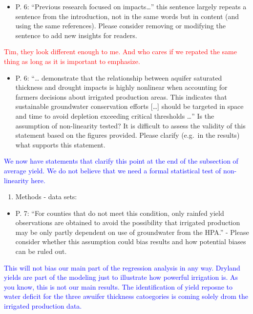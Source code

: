 \documentclass[
]{article}
\providecommand{\tightlist}{%
  \setlength{\itemsep}{0pt}\setlength{\parskip}{0pt}}
\begin{document}
\begin{itemize}
\tightlist
\item
  P. 6: ``Previous research focused on impacts\ldots{}'' this sentence
  largely repeats a sentence from the introduction, not in the same
  words but in content (and using the same references). Please consider
  removing or modifying the sentence to add new insights for readers.
\end{itemize}

\textcolor{red}{Tim, they look different enough to me. And who cares if we repated the same thing as long as it is important to emphasize.}

\begin{itemize}
\tightlist
\item
  P. 6: ``\ldots{} demonstrate that the relationship between aquifer
  saturated thickness and drought impacts is highly nonlinear when
  accounting for farmers decisions about irrigated production areas.
  This indicates that sustainable groundwater conservation efforts
  {[}\ldots{]} should be targeted in space and time to avoid depletion
  exceeding critical thresholds \ldots{}'' Is the assumption of
  non-linearity tested? It is difficult to assess the validity of this
  statement based on the figures provided. Please clarify (e.g.~in the
  results) what supports this statement.
\end{itemize}

\textcolor{blue}{We now have statements that clarify this point at the end of the subsection of average yield. We do not believe that we need a formal statistical test of non-linearity here.}

\begin{enumerate}
\def\labelenumi{\arabic{enumi}.}
\setcounter{enumi}{5}
\tightlist
\item
  Methods - data sets:
\end{enumerate}

\begin{itemize}
\tightlist
\item
  P. 7: ``For counties that do not meet this condition, only rainfed
  yield observations are obtained to avoid the possibility that
  irrigated production may be only partly dependent on use of
  groundwater from the HPA.'' - Please consider whether this assumption
  could bias results and how potential biases can be ruled out.
\end{itemize}

\textcolor{blue}{
This will not bias our main part of the regression analysis in any way. Dryland yields are part of the modeling just to illustrate how powerful irrigation is. As you know, this is not our main results. The identification of yield reposne to water deficit for the three awuifer thickness catoegories is coming solely drom the irrigated production data.
}
\end{document}
